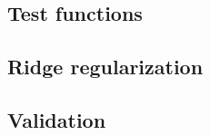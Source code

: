 \documentclass{article}
\begin{document}
\subsection{Test functions}\label{appendix:generate-test-functions}


\subsection{Ridge regularization}\label{appendix:ridge-regularization}


\subsection{Validation}\label{appendix:validation}

\end{document}

